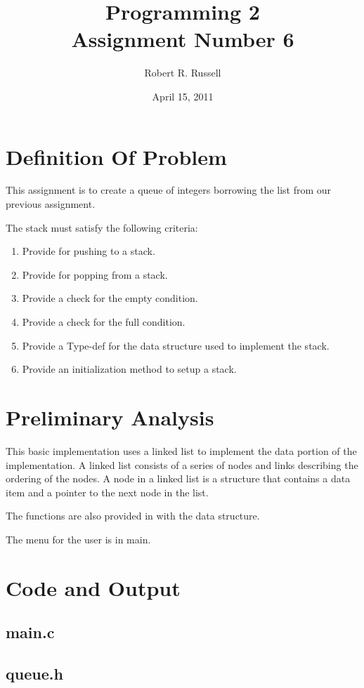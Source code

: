 \documentclass[letterpaper,oneside]{scrartcl}
\title{Programming 2\\Assignment Number 6}
\author{Robert R. Russell}
\date{April 15, 2011}
\begin{document}
\maketitle

\section{Definition Of Problem}
This assignment is to create a queue of integers borrowing the list from our
previous assignment.

The stack must satisfy the following criteria:
\begin{enumerate}
\item Provide for pushing to a stack.
\item Provide for popping from a stack.
\item Provide a check for the empty condition.
\item Provide a check for the full condition.
\item Provide a Type-def for the data structure used to implement the stack.
\item Provide an initialization method to setup a stack.
\end{enumerate}

\section{Preliminary Analysis}

This basic implementation uses a linked list to implement the data portion of the implementation.
A linked list consists of a series of nodes and links describing the ordering of the nodes.
A node in a linked list is a structure that contains a data item and a pointer to the next node in the list.

The functions are also provided in with the data structure.

The menu for the user is in main.

\section{Code and Output}

\subsection{main.c}

\subsection{queue.h}
\end{document}
